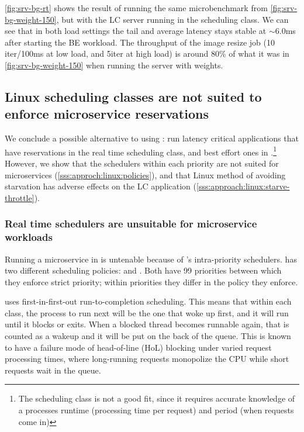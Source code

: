 \autoref{fig:srv-bg-rt} shows the result of running the same microbenchmark from
\autoref{fig:srv-bg-weight-150}, but with the LC server running in the
\rtclass{} scheduling class. We can see that in both load settings the tail and
average latency stays stable at $\sim$6.0ms after starting the BE workload. The
throughput of the image resize job (10 iter/100ms at low load, and 5iter at high
load) is around 80\% of what it was in \autoref{fig:srv-bg-weight-150} when
running the server with \cgroups{} weights.

\subsection{Linux scheduling classes are not suited to enforce microservice
reservations}\label{ss:approach:linux-classes-bad-fit}

We conclude a possible alternative to using \cgroups{}: run latency critical
applications that have reservations in the real time \rtclass{} scheduling
class, and best effort ones in \normalclass{}.\footnote{The \deadlineclass{}
scheduling class is not a good fit, since it requires accurate knowledge of a
processes runtime (processing time per request) and period (when requests come
in)} However, we show that the schedulers within each priority are not suited
for microservices (\autoref{sss:approch:linux:policies}), and that Linux method
of avoiding starvation has adverse effects on the LC application
(\autoref{sss:approach:linux:starve-throttle}).

\subsubsection{Real time schedulers are unsuitable for microservice
workloads}\label{sss:approch:linux:policies}

Running a microservice in \rtclass{} is untenable because of \rtclass{}'s
intra-priority schedulers. \rtclass{} has two different scheduling policies:
\schedfifo{} and \schedrr{}. Both have 99 priorities between which they enforce
strict priority; within priorities they differ in the policy they enforce.

\schedfifo{} uses first-in-first-out run-to-completion scheduling. This means
that within each class, the process to run next will be the one that woke up
first, and it will run until it blocks or exits. When a blocked thread becomes
runnable again, that is counted as a wakeup and it will be put on the back of
the queue. This is known to have a failure mode of head-of-line (HoL) blocking
under varied request processing times, where long-running requests monopolize
the CPU while short requests wait in the queue.

